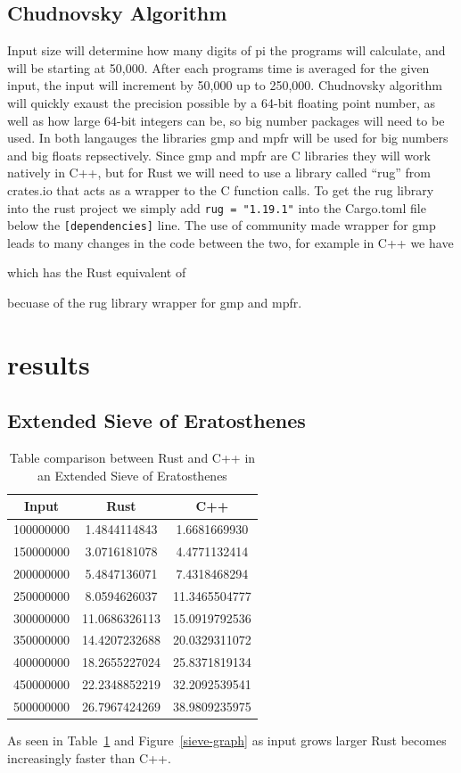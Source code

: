 \documentclass[10pt]{IEEEtran}
\begin{document}
\subsection{Chudnovsky Algorithm}
Input size will determine how many digits of pi the programs will calculate, and will be starting at 50,000. 
After each programs time is averaged for the given input, the input will increment by 50,000 up to 250,000.
Chudnovsky algorithm will quickly exaust the precision possible by a 64-bit floating point number, as well as how large 64-bit integers can be, so big number packages will need to be used.
In both langauges the libraries gmp\cite{gmp} and mpfr\cite{mpfr} will be used for big numbers and big floats repsectively.
Since gmp and mpfr are C libraries they will work natively in C++, but for Rust we will need to use a library called ``rug'' from crates.io that acts as a wrapper to the C function calls\cite{rug}.
To get the rug library into the rust project we simply add \verb|rug = "1.19.1"| into the Cargo.toml file below the \verb|[dependencies]| line.
The use of community made wrapper for gmp leads to many changes in the code between the two, for example in C++ we have

which has the Rust equivalent of

becuase of the rug library wrapper for gmp and mpfr.
\section{results}
\subsection{Extended Sieve of Eratosthenes}
\begin{table}[!ht]
    \centering
    \begin{tabular}{|c|c|c|}
    \hline
        \rowcolor{lightgray}
        Input & Rust & C++ \\ \hline
        100000000 & 1.4844114843 & 1.6681669930 \\ \hline
        150000000 & 3.0716181078 & 4.4771132414 \\ \hline
        200000000 & 5.4847136071 & 7.4318468294 \\ \hline
        250000000 & 8.0594626037 & 11.3465504777 \\ \hline
        300000000 & 11.0686326113 & 15.0919792536 \\ \hline
        350000000 & 14.4207232688 & 20.0329311072 \\ \hline
        400000000 & 18.2655227024 & 25.8371819134 \\ \hline
        450000000 & 22.2348852219 & 32.2092539541 \\ \hline
        500000000 & 26.7967424269 & 38.9809235975 \\ \hline
    \end{tabular}
    \caption{\label{sieve-table}Table comparison between Rust and C++ in an Extended Sieve of Eratosthenes}
\end{table}
As seen in Table~\ref{sieve-table} and Figure~\ref{sieve-graph} as input grows larger Rust becomes increasingly faster than C++.
\end{document}

